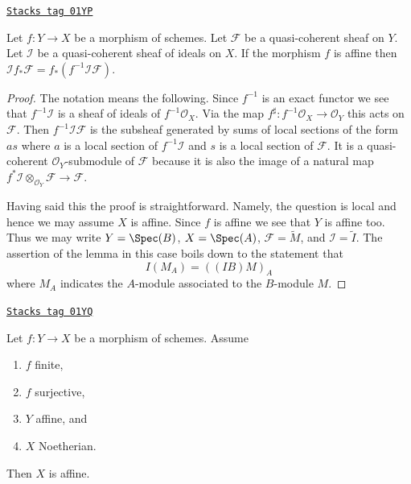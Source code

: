 \begin{lemma}
\label{coherent-lemma-affine-morphism-projection-ideal}
\href{https://stacks.math.columbia.edu/tag/01YP}{\texttt{Stacks tag 01YP}}

Let $f : Y \to X$ be a morphism of schemes.
Let $\mathcal{F}$ be a quasi-coherent sheaf on $Y$.
Let $\mathcal{I}$ be a quasi-coherent sheaf of ideals on $X$.
If the morphism $f$ is affine then
$\mathcal{I}f_*\mathcal{F} = f_*(f^{-1}\mathcal{I}\mathcal{F})$.
\end{lemma}

\begin{proof}
The notation means the following. Since $f^{-1}$ is an exact functor
we see that $f^{-1}\mathcal{I}$ is a sheaf
of ideals of $f^{-1}\mathcal{O}_X$. Via the map
$f^\sharp : f^{-1}\mathcal{O}_X \to \mathcal{O}_Y$ this acts on
$\mathcal{F}$. Then $f^{-1}\mathcal{I}\mathcal{F}$ is the subsheaf
generated by sums of local sections of the form $as$ where $a$
is a local section of $f^{-1}\mathcal{I}$ and $s$ is a local section
of $\mathcal{F}$. It is a quasi-coherent $\mathcal{O}_Y$-submodule
of $\mathcal{F}$ because it is also the image of a natural map
$f^*\mathcal{I} \otimes_{\mathcal{O}_Y} \mathcal{F} \to \mathcal{F}$.

\medskip\noindent
Having said this the proof is straightforward. Namely, the question is local
and hence we may assume $X$ is affine. Since $f$ is affine we see that
$Y$ is affine too. Thus we may write
$Y = \Spec(B)$, $X = \Spec(A)$, $\mathcal{F} = \widetilde{M}$,
and $\mathcal{I} = \widetilde{I}$. The assertion of the lemma in this
case boils down to the statement that
$$
I(M_A) = ((IB)M)_A
$$
where $M_A$ indicates the $A$-module associated to the $B$-module $M$.
\end{proof}

\begin{lemma}
\label{coherent-lemma-image-affine-finite-morphism-affine-Noetherian}
\href{https://stacks.math.columbia.edu/tag/01YQ}{\texttt{Stacks tag 01YQ}}

Let $f : Y \to X$ be a morphism of schemes.
Assume
\begin{enumerate}
\item $f$ finite,
\item $f$ surjective,
\item $Y$ affine, and
\item $X$ Noetherian.
\end{enumerate}
Then $X$ is affine.
\end{lemma}

